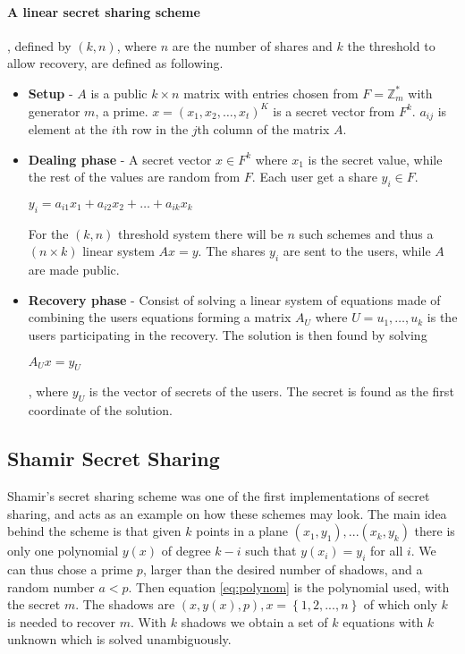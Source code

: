 \paragraph{A linear secret sharing scheme\cite{lsss}}, defined by $(k,n)$, where $n$ are the number of shares and $k$ the threshold to allow recovery, are defined as following.\\
\begin{itemize}
\item \textbf{Setup} -  $A$ is a public $k\times n$ matrix with entries chosen from $F = \mathbb{Z}_m^*$ with generator $m$, a prime. $x=(x_1,x_2,\dots,x_t)^K$ is a secret vector from $F^k$. $a_{ij}$ is element at the $i$th row in the $j$th column of the matrix $A$.
\item \textbf{Dealing phase} - A secret vector $x \in F^k$ where $x_1$ is the secret value, while the rest of the values are random from $F$. Each user get a share $y_i \in F$.
\centerline{$y_i = a_{i1}x_1 + a_{i2}x_2 + \dots + a_{ik}x_k$}
For the $(k,n)$ threshold system there will be $n$ such schemes and thus a $(n\times k)$ linear system $Ax=y$.
The shares $y_i$ are sent to the users, while $A$ are made public.
\item \textbf{Recovery phase} - Consist of solving a linear system of equations made of combining the users equations forming a matrix $A_U$ where $U = {u_1, \dots, u_k}$ is the users participating in the recovery. The solution is then found by solving 
\centerline{$A_Ux=y_U$}, where $y_U$ is the vector of secrets of the users. The secret is found as the first coordinate of the solution.
\end{itemize}

\subsection{Shamir Secret  Sharing}\label{sec:secret_sharing}
 Shamir's secret sharing scheme \cite{shamir_share} was one of the first implementations of secret sharing, and acts as an example on how these schemes may look. The main idea behind the scheme is that given $k$ points in a plane $(x_1,y_1), ... (x_k,y_k)$ there is only one polynomial $y(x)$ of degree $k-i$ such that $y(x_i) = y_i$ for all $i$. We can thus chose a prime $p$, larger than the desired number of shadows, and a random number $a < p$. Then equation \ref{eq:polynom} is the polynomial used, with the secret $m$. The shadows are $(x, y(x), p) , x=\left\{ {1,2, ... ,n}\right\}$ of which only $k$ is needed to recover $m$. With $k$ shadows we obtain a set of $k$ equations with $k$ unknown which is solved unambiguously.

